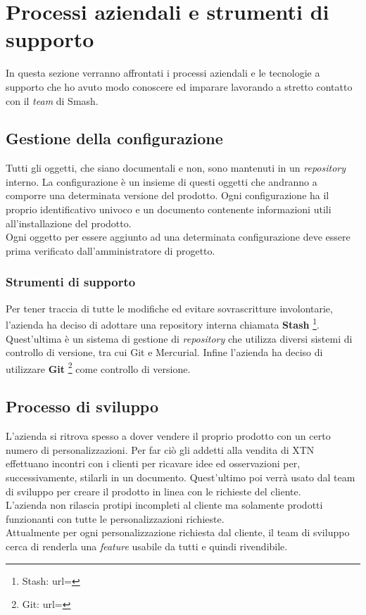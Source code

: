 \section{Processi aziendali e strumenti di supporto}
In questa sezione verranno affrontati i processi aziendali e le tecnologie a supporto che ho avuto modo conoscere ed imparare lavorando a stretto contatto con il \textit{team} di Smash\textregistered.

\subsection{Gestione della configurazione}
Tutti gli oggetti, che siano documentali e non, sono mantenuti in un \textit{repository} interno. La configurazione è un insieme di questi oggetti che andranno a comporre una determinata versione del prodotto. Ogni configurazione ha il proprio identificativo univoco e un documento contenente informazioni utili all'installazione del prodotto.\\
Ogni oggetto per essere aggiunto ad una determinata configurazione deve essere prima verificato dall'amministratore di progetto.
\subsubsection{Strumenti di supporto}
Per tener traccia di tutte le modifiche ed evitare sovrascritture involontarie, l'azienda ha deciso di adottare una repository interna chiamata \textbf{Stash} \footnote{Stash: url= }. Quest'ultima è un sistema di gestione di \textit{repository} che utilizza diversi sistemi di controllo di versione, tra cui Git e Mercurial. Infine l'azienda ha deciso di utilizzare \textbf{Git} \footnote{Git: url= } come controllo di versione.
\subsection{Processo di sviluppo}
L'azienda si ritrova spesso a dover vendere il proprio prodotto con un certo numero di personalizzazioni. Per far ciò gli addetti alla vendita di XTN effettuano incontri con i clienti per ricavare idee ed osservazioni per, successivamente, stilarli in un documento. Quest'ultimo poi verrà usato dal team di sviluppo per creare il prodotto in linea con le richieste del cliente.\\
L'azienda non rilascia protipi incompleti al cliente ma solamente prodotti funzionanti con tutte le personalizzazioni richieste.\\
Attualmente per ogni personalizzazione richiesta dal cliente, il team di sviluppo cerca di renderla una \textit{feature} usabile da tutti e quindi rivendibile.
